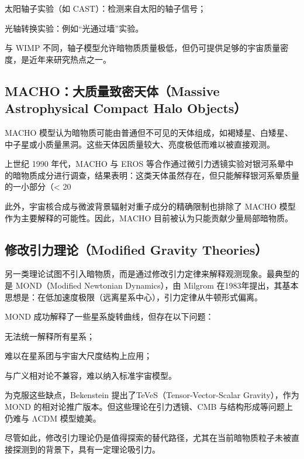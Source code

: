 太阳轴子实验（如 CAST）：检测来自太阳的轴子信号；

光轴转换实验：例如“光通过墙”实验。

与 WIMP 不同，轴子模型允许暗物质质量极低，但仍可提供足够的宇宙质量密度，是近年来研究热点之一。

\subsection{MACHO：大质量致密天体（Massive Astrophysical Compact Halo Objects）}

MACHO 模型认为暗物质可能由普通但不可见的天体组成，如褐矮星、白矮星、中子星或小质量黑洞。这些天体因质量较大、亮度极低而难以被直接观测。

上世纪 1990 年代，MACHO 与 EROS 等合作通过微引力透镜实验对银河系晕中的暗物质成分进行调查，结果表明：这类天体虽然存在，但只能解释银河系晕质量的一小部分（< 20%

此外，宇宙核合成与微波背景辐射对重子成分的精确限制也排除了 MACHO 模型作为主要解释的可能性。因此，MACHO 目前被认为只能贡献少量局部暗物质。

\subsection{修改引力理论（Modified Gravity Theories）}

另一类理论试图不引入暗物质，而是通过修改引力定律来解释观测现象。最典型的是 MOND（Modified Newtonian Dynamics），由 Milgrom 在1983年提出，其基本思想是：在低加速度极限（远离星系中心），引力定律从牛顿形式偏离。

MOND 成功解释了一些星系旋转曲线，但存在以下问题：

无法统一解释所有星系；

难以在星系团与宇宙大尺度结构上应用；

与广义相对论不兼容，难以纳入标准宇宙模型。

为克服这些缺点，Bekenstein 提出了TeVeS（Tensor-Vector-Scalar Gravity），作为 MOND 的相对论推广版本。但这些理论在引力透镜、CMB 与结构形成等问题上仍难与 ΛCDM 模型媲美。

尽管如此，修改引力理论仍是值得探索的替代路径，尤其在当前暗物质粒子未被直接探测到的背景下，具有一定理论吸引力。

\newpage
